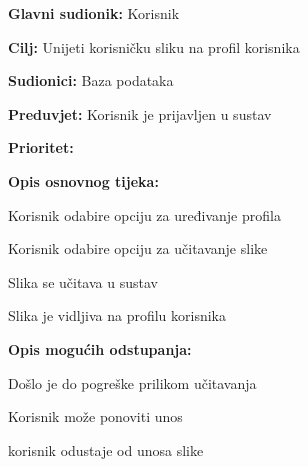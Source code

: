 \noindent {}
    \begin{packed_item}
    	
    	\item \textbf{Glavni sudionik: }
    	Korisnik 
    	\item  \textbf{Cilj:} Unijeti korisničku sliku na profil korisnika
    	\item  \textbf{Sudionici:} Baza podataka
    	\item  \textbf{Preduvjet:} Korisnik je prijavljen u sustav
    	\item  \textbf{Prioritet:} 
    	\item  \textbf{Opis osnovnog tijeka:}
    	
    	\item[] \begin{packed_enum}
    		
    		\item Korisnik odabire opciju za uređivanje profila
    		\item Korisnik odabire opciju za učitavanje slike
    		\item Slika se učitava u sustav
    		\item Slika je vidljiva na profilu korisnika
    		
    	\end{packed_enum}
    	
    	\item  \textbf{Opis mogućih odstupanja:}
    	
    	\item[] \begin{packed_item}
    		
    		\item[2.a] Došlo je do pogreške prilikom učitavanja
    		\item[] \begin{packed_enum}
    			
    			\item Korisnik može ponoviti unos 
    			\item korisnik odustaje od unosa slike
    			
    		\end{packed_enum}
    	\end{packed_item}
    \end{packed_item}

